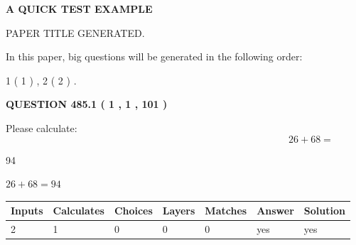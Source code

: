 \documentclass[12pt]{article}
\begin{document}
   
 \vspace{0.2in}
{\LARGE {\textbf{ A QUICK TEST EXAMPLE}}}
   
   
 PAPER TITLE GENERATED.
   
   
   
\vspace{0.2in}
   
In this paper, big questions will be generated in the following order: 
   
   
   1 ( 1 )
 ,
   2 ( 2 )
 .
  
\vspace{0.2in}
  
{\textbf{\Large{QUESTION
485.1 
 ( 1 , 1 , 101 )
}}}
  
  
 
Please calculate:
\begin{equation}
26 +  %
68 = \nonumber
\end{equation}
 
 
 
\noindent{}
 
 

94
 
 
\noindent{}
 
 

 
 
 
\noindent{}
 
 

$ %
26 +  %
68=   %
94$
 
 
\noindent{}
 
 

 
   
   
   
   
\noindent\begin{tabular}{|l|l|l|l|l|l|l|}
 \hline
Inputs & Calculates & Choices & Layers & Matches & Answer & Solution \\ \hline
 2  & 
 1  & 
 0
  & 
 0  & 
 0  & 
  yes & 
  yes 
  \\ \hline
 \end{tabular}
   
   
   
   
\noindent{}
   
\end{document}

